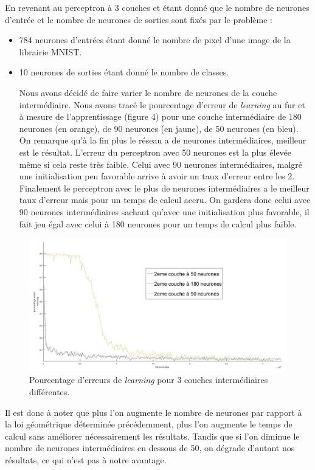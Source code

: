 \documentclass[a4paper,oneside]{report}
\begin{document}
\newpage
En revenant au perceptron à 3 couches et étant donné que le nombre de neurones d'entrée et le nombre de neurones de sorties sont fixés par le problème  :
\begin{itemize}
\item 784 neurones d'entrées étant donné le nombre de pixel d'une image de la librairie MNIST.
\item 10 neurones de sorties étant donné le nombre de classes.


Nous avons décidé de faire varier le nombre de neurones de la couche intermédiaire. Nous avons tracé le pourcentage d'erreur de \textit{learning} au fur et à mesure de l'apprentissage (figure 4) pour une couche intermédiaire de 180 neurones (en orange), de 90 neurones (en jaune), de 50 neurones (en bleu). On remarque qu'à la fin plus le réseau a de neurones intermédiaires, meilleur est le résultat. L'erreur du perceptron avec 50 neurones est la plus élevée même si cela reste très faible. Celui avec 90 neurones intermédiaires, malgré une initialisation peu favorable arrive à avoir un taux d'erreur entre les 2. Finalement le perceptron avec le plus de neurones intermédiaires a le meilleur taux d'erreur mais pour un temps de calcul accru. On gardera donc celui avec 90 neurones intermédiaires sachant qu'avec une initialisation plus favorable, il fait jeu égal avec celui à 180 neurones pour un temps de calcul plus faible. 
\end{itemize}
\begin{figure}[!ht]
	\begin{center}
		\includegraphics[scale=0.27]{Images/courbes3couche.jpg} 
		\caption{Pourcentage d'erreurs de \textit{learning} pour 3 couches intermédiaires différentes.}
	\end{center}
\end{figure}

Il est donc à noter que plus l'on augmente le nombre de neurones par rapport à la loi géométrique déterminée précédemment, plus l'on augmente le temps de calcul sans améliorer nécessairement les résultats. Tandis que si l'on diminue le nombre de neurones intermédiaires en dessous de 50, on dégrade d'autant nos résultats, ce qui n'est pas à notre avantage.
\end{document}
